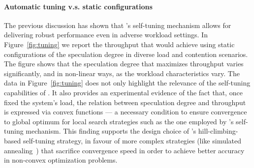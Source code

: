 \paragraph{Automatic tuning v.s. static configurations} The previous discussion has shown that \specula's self-tuning mechanism allows for delivering robust performance even in  adverse workload settings. In Figure~\ref{fig:tuning} we report the throughput that \specula would achieve using static configurations of the speculation degree in diverse load and  contention scenarios. The figure shows that the  speculation degree that maximizes throughput varies significantly, and in non-linear ways, as the workload characteristics vary. The data in Figure~\ref{fig:tuning} does not only highlight the relevance of the self-tuning capabilities of \specula. It also provides an experimental evidence of the fact that, once fixed the system's load, the relation between speculation degree and throughput is expressed via convex functions --- a necessary condition to ensure convergence to global optimum for local search strategies such as the one employed by \specula's self-tuning mechanism. This finding supports the design choice of \specula's hill-climbing-based self-tuning strategy, in favour of more complex strategies (like simulated annealing~\cite{hillclimbing}) that sacrifice convergence speed in order to achieve better accuracy in non-convex optimization problems.





